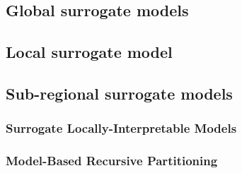 \subsection{Global surrogate models}

\subsection{Local surrogate model}

\subsection{Sub-regional surrogate models}

\subsubsection{Surrogate Locally-Interpretable Models}

\subsubsection{Model-Based Recursive Partitioning}